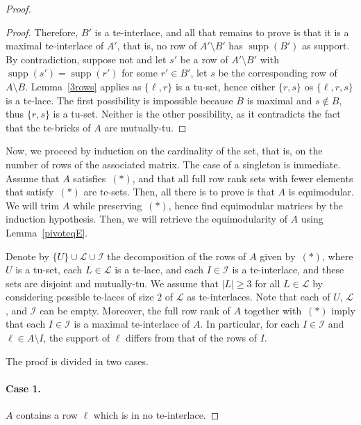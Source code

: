 \documentclass[11pt,a4paper]{amsart}
\renewcommand*{\geq}{\geqslant}
\theoremstyle{plain}
\theoremstyle{definition}
\newcommand{\cal}[1]{\mathcal{#1}}
\DeclareMathOperator{\supp}{supp}
\renewcommand{\cal}[1]{\mathcal{#1}}
\begin{document}
\begin{proof}
\begin{proof}
Therefore, $B'$ is a te-interlace, and all that remains to prove is that it is a maximal te-interlace of $A'$, that is, no row of $A'\setminus B'$ has $\supp(B')$ as support.
By contradiction, suppose not and let $s'$ be a row of $A'\setminus B'$ with $\supp(s')=\supp(r')$ for some $r'\in B'$, let $s$ be the corresponding row of $A\setminus B$.
Lemma~\ref{3rows} applies as $\{\ell,r\}$ is a tu-set, hence either $\{r,s\}$ os $\{\ell,r,s\}$ is a te-lace.
The first possibility is impossible because $B$ is maximal and $s\notin B$, thus $\{r,s\}$ is a tu-set.
Neither is the other possibility, as it contradicts the fact that the te-bricks of $A$ are mutually-tu.
\end{proof}


Now, we proceed by induction on the cardinality of the set, that is, on the number of rows of the associated matrix.
The case of a singleton is immediate.
Assume that $A$ satisfies~$(\ast)$, and that all full row rank sets with fewer elements that satisfy~$(\ast)$ are te-sets.
Then, all there is to prove is that $A$ is equimodular.
We will trim $A$ while preserving~$(\ast)$, hence find equimodular matrices by the induction hypothesis.
Then, we will retrieve the equimodularity of $A$ using Lemma~\ref{pivoteqE}.

\medskip

Denote by $\{U\}\cup \cal L \cup \cal I$ the decomposition of the rows of $A$ given by~$(\ast)$, where $U$ is a tu-set, each $L\in\cal L$ is a te-lace, and each $I\in\cal I$ is a te-interlace, and these sets are disjoint and mutually-tu.
We assume that $|L|\geq 3$ for all $L\in \cal L$ by considering possible te-laces of size $2$ of $\cal L$ as te-interlaces.
Note that each of $U$, $\cal L$, and $\cal I$ can be empty.
Moreover, the full row rank of $A$ together with~$(\ast)$ imply that each $I\in\cal I$ is a maximal te-interlace of $A$.
In particular, for each $I\in \cal I$ and $\ell\in A\setminus I$, the support of $\ell$ differs from that of the rows of $I$.

\medskip

The proof is divided in two cases.

\medskip
\paragraph{\bf Case 1.} $A$ contains a row $\ell$ which is in no te-interlace.


\end{proof}
\end{document}
